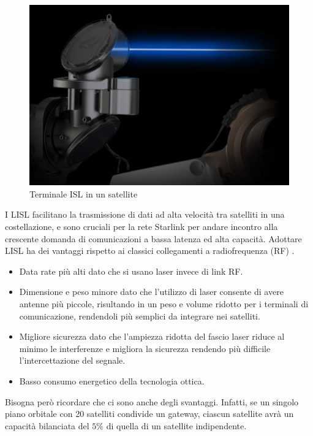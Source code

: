 \begin{figure}[htbp]
  \centering
  \includegraphics[width=0.9\linewidth]{./res/img/LISL_terminal.png}
  \caption{Terminale \ac{ISL} in un satellite \cite{mike_puchol_modeling_2022}}
  \label{fig:starlink-terminal}
\end{figure}

I \ac{LISL} facilitano la trasmissione di dati ad alta velocità tra satelliti in una costellazione, e sono cruciali per la rete Starlink per andare incontro alla crescente domanda di comunicazioni a bassa latenza ed alta capacità.
Adottare \ac{LISL} ha dei vantaggi rispetto ai classici collegamenti a radiofrequenza (\ac{RF}) \cite{chaudhry_laser_2021}.
\begin{itemize}
  \item Data rate più alti dato che si usano laser invece di link \ac{RF}.
  \item Dimensione e peso minore dato che l'utilizzo di laser consente di avere antenne più piccole, risultando in un peso e volume ridotto per i terminali di comunicazione, rendendoli più semplici da integrare nei satelliti.
  \item Migliore sicurezza dato che l'ampiezza ridotta del fascio laser riduce al minimo le interferenze e migliora la sicurezza rendendo più difficile l'intercettazione del segnale.
  \item Basso consumo energetico della tecnologia ottica.
\end{itemize}

Bisogna però ricordare che ci sono anche degli svantaggi.
Infatti, se un singolo piano orbitale con 20 satelliti condivide un gateway, ciascun satellite avrà un capacità bilanciata del $5\%$ di quella di un satellite indipendente.


